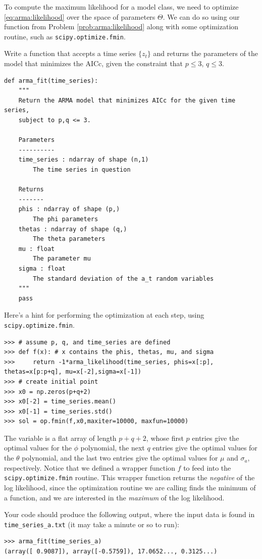 To compute the maximum likelihood for a model class, we need to optimize
\ref{eq:arma:likelihood} over the space of parameters $\Theta$. We can do so
using our function from Problem \ref{prob:arma:likelihood} along with some
optimization routine, such as {\tt scipy.optimize.fmin}.

\begin{problem}
\label{prob:arma:mle}
Write a function that accepts a time series $\{z_t\}$ and returns the
parameters of the model that minimizes the AICc, given the constraint that $p
\leq 3$, $q \leq 3$.

\begin{lstlisting}
def arma_fit(time_series):
    """
    Return the ARMA model that minimizes AICc for the given time series,
    subject to p,q <= 3.

    Parameters
    ----------
    time_series : ndarray of shape (n,1)
        The time series in question

    Returns
    -------
    phis : ndarray of shape (p,)
        The phi parameters
    thetas : ndarray of shape (q,)
        The theta parameters
    mu : float
        The parameter mu
    sigma : float
        The standard deviation of the a_t random variables
    """
    pass
\end{lstlisting}
\vspace{3mm} \noindent
Here's a hint for performing the optimization at each step, using {\tt scipy.optimize.fmin}.
\begin{lstlisting}
>>> # assume p, q, and time_series are defined
>>> def f(x): # x contains the phis, thetas, mu, and sigma
>>>     return -1*arma_likelihood(time_series, phis=x[:p], thetas=x[p:p+q], mu=x[-2],sigma=x[-1])
>>> # create initial point
>>> x0 = np.zeros(p+q+2)
>>> x0[-2] = time_series.mean()
>>> x0[-1] = time_series.std()
>>> sol = op.fmin(f,x0,maxiter=10000, maxfun=10000)
\end{lstlisting}
\vspace{3mm} \noindent
The variable  is a flat array of length $p+q+2$, whose first $p$ entries give the optimal values
for the $\phi$ polynomial, the next $q$ entries give the optimal values for the $\theta$ polynomial,
and the last two entries give the optimal values for $\mu$ and $\sigma_a$, respectively.
Notice that we defined a wrapper function $f$ to feed into the {\tt scipy.optimize.fmin} routine.
This wrapper function returns the \emph{negative} of the log likelihood, since the optimization routine we are
calling finds the minimum of a function, and we are interested in the \emph{maximum} of the log likelihood.

Your code should produce the following output, where the input data is found in
{\tt time\_series\_a.txt} (it may take a minute or so to run):
\begin{lstlisting}
>>> arma_fit(time_series_a)
(array([ 0.9087]), array([-0.5759]), 17.0652..., 0.3125...)
\end{lstlisting}
\end{problem}

